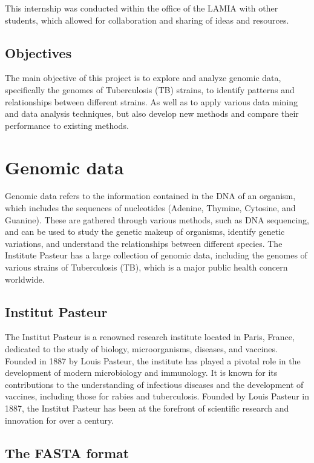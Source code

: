 This internship was conducted within the office of the LAMIA with other students, which allowed for collaboration and
sharing of ideas and resources.

\section{Objectives}
\label{sec:objectives}

The main objective of this project is to explore and analyze genomic data, specifically the genomes of Tuberculosis (TB) strains, to
identify patterns and relationships between different strains. As well as to apply various data mining and data analysis techniques,
but also develop new methods and compare their performance to existing methods.

\chapter{Genomic data}
\label{chap:genomic_data}

Genomic data refers to the information contained in the DNA of an organism, which includes the sequences of nucleotides (Adenine, Thymine,
Cytosine, and Guanine). These are gathered through various methods, such as DNA sequencing, and can be used to study the genetic makeup
of organisms, identify genetic variations, and understand the relationships between different species. The Institute Pasteur has a large
collection of genomic data, including the genomes of various strains of Tuberculosis (TB), which is a major public health concern worldwide.

\section{Institut Pasteur}
\label{sec:institut_pasteur}

The Institut Pasteur is a renowned research institute located in Paris, France, dedicated to the study of biology,
microorganisms, diseases, and vaccines. Founded in 1887 by Louis Pasteur, the institute has played a pivotal role
in the development of modern microbiology and immunology. It is known for its contributions to the understanding of
infectious diseases and the development of vaccines, including those for rabies and tuberculosis. Founded by
Louis Pasteur in 1887, the Institut Pasteur has been at the forefront of scientific research and innovation for over
a century.

\section{The FASTA format}
\label{sec:fasta_format}

